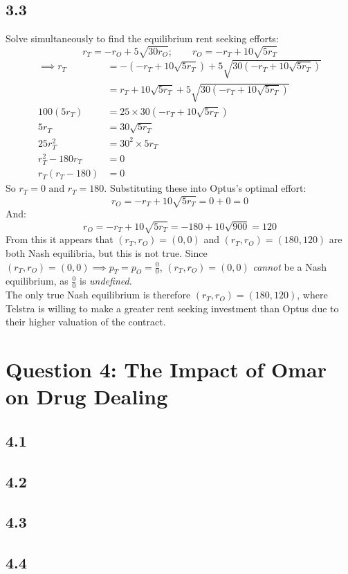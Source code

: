 \documentclass{article}
\begin{document}
\subsection*{3.3}
Solve simultaneously to find the equilibrium rent seeking efforts:
$$r_{T} = -r_{O} + 5\sqrt{30r_{O}}; \qquad r_{O} = -r_{T} + 10\sqrt{5r_{T}}$$
\begin{align*}
    \implies r_{T} &= -(-r_{T} + 10\sqrt{5r_{T}}) + 5\sqrt{30(-r_{T} + 10\sqrt{5r_{T}})}\\
    &= r_{T} + 10\sqrt{5r_{T}} + 5\sqrt{30(-r_{T} + 10\sqrt{5r_{T}})}\\
    100(5r_{T}) &= 25 \times 30(-r_{T} + 10\sqrt{5r_{T}})\\
    5r_{T} &= 30\sqrt{5r_{T}}\\
    25r_{T}^2 &= 30^{2} \times 5r_{T}\\
    r_{T}^2 - 180r_{T} &= 0\\
    r_{T}(r_{T} - 180) &= 0
\end{align*}
So $r_{T} = 0 \mbox{ and } r_{T} = 180$. Substituting these into Optus's optimal effort:
$$r_{O} = -r_{T} + 10\sqrt{5r_{T}} = 0 + 0 = 0$$
And:
$$r_{O} = -r_{T} + 10\sqrt{5r_{T}} = -180 + 10\sqrt{900} = 120$$
From this it appears that $(r_{T}, r_{O}) = (0, 0)$ and $(r_{T}, r_{O}) = (180, 120)$ are both Nash equilibria, but this is not true. Since $(r_{T}, r_{O}) = (0, 0) \implies p_{T} = p_{O} = \frac{0}{0}$, $(r_{T}, r_{O}) = (0, 0)$ \textit{cannot} be a Nash equilibrium, as $\frac{0}{0}$ is \textit{undefined}.\\[2mm]
The only true Nash equilibrium is therefore $(r_{T}, r_{O}) = (180, 120)$, where Telstra is willing to make a greater rent seeking investment than Optus due to their higher valuation of the contract.


\section*{Question 4: The Impact of Omar on Drug Dealing}
\subsection*{4.1}
\subsection*{4.2}
\subsection*{4.3}
\subsection*{4.4}
\end{document}
